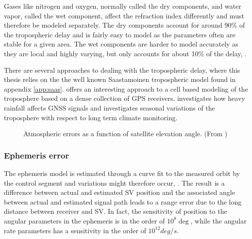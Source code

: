 Gases like nitrogen and oxygen, normally called the dry components, and water vapor, called the wet component, affect the refraction index differently and must therefore be modeled separately. The dry components account for around 90\% of the tropospheric delay and is fairly easy to model as the parameters often are stable for a given area. The wet components are harder to model accurately as they are local and highly varying, but only accounts for about 10\% of the delay, \cite{farrell2008aided, groves2013principles}. 

There are several approaches to dealing with the tropospheric delay, where this thesis relies on the the well known Saastamoinen tropospheric model found in appendix \ref{app:saas}. \cite{hirahara2000local} offers an interesting approach to a cell based modeling of the troposphere based on a dense collection of GPS receivers. \cite{priego2017monitoring} investigates how heavy rainfall affects GNSS signals and \cite{baldysz2016comparison} investigates seasonal variations of the troposphere with respect to long term climate monitoring.

\begin{figure}[!htbp]
	\centering
    \caption[Relation between atmospheric errors and elevation]{Atmospheric errors as a function of satellite elevation angle. (From \cite{groves2013principles})}
    \label{fig:atmo_elev_error}
\end{figure}

\subsubsection{Ephemeris error}
\label{sec:eph_error}
The ephemeris model is estimated through a curve fit to the measured orbit by the control segment and variations might therefore occur, \cite{farrell2008aided}. The result is a difference between actual and estimated SV position and the associated angle between actual and estimated signal path leads to a range error due to the long distance between receiver and SV. In fact, the sensitivity of position to the angular parameters in the ephemeris is in the order of $10^8 \deg$, while the angular rate parameters has a sensitivity in the order of $10^{12}deg/s$. 


